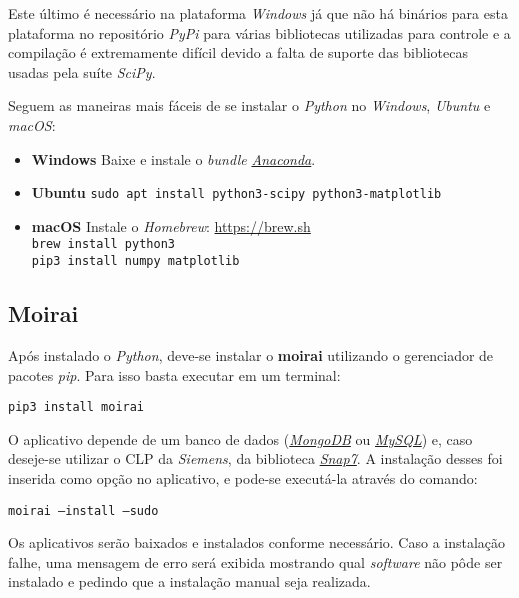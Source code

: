 Este último é necessário na plataforma \textit{Windows} já que não há binários
para esta plataforma no repositório \textit{PyPi} para várias bibliotecas
utilizadas para controle e a compilação é extremamente difícil devido a falta de
suporte das bibliotecas usadas pela suíte \textit{SciPy}.

Seguem as maneiras mais fáceis de se instalar o \textit{Python} no
\textit{Windows}, \textit{Ubuntu} e \textit{macOS}\@:

\begin{itemize}
\item \textbf{Windows}
        Baixe e instale o \textit{bundle}
        \href{https://www.continuum.io/downloads}{\textit{Anaconda}}.

\item \textbf{Ubuntu}
        \texttt{sudo apt install python3-scipy python3-matplotlib}

\item \textbf{macOS}
        Instale o \textit{Homebrew}: \url{https://brew.sh}\\
        \texttt{brew install python3}\\
        \texttt{pip3 install numpy matplotlib}
\end{itemize}

\subsection{Moirai}%
\label{subsec:install-moirai}

Após instalado o \textit{Python}, deve-se instalar o \textbf{moirai} utilizando
o gerenciador de pacotes \textit{pip}. Para isso basta executar em um terminal:

\texttt{pip3 install moirai}

O aplicativo depende de um banco de dados
(\href{https://www.mongodb.com/}{\textit{MongoDB}} ou
\href{https://www.mysql.com/}{\textit{MySQL}}) e, caso deseje-se utilizar o CLP
da \textit{Siemens}, da biblioteca
\href{http://snap7.sourceforge.net/}{\textit{Snap7}}. A instalação desses foi
inserida como opção no aplicativo, e pode-se executá-la através do comando:

\texttt{moirai --install --sudo}

Os aplicativos serão baixados e instalados conforme necessário. Caso a
instalação falhe, uma mensagem de erro será exibida mostrando qual
\textit{software} não pôde ser instalado e pedindo que a instalação manual seja
realizada.

